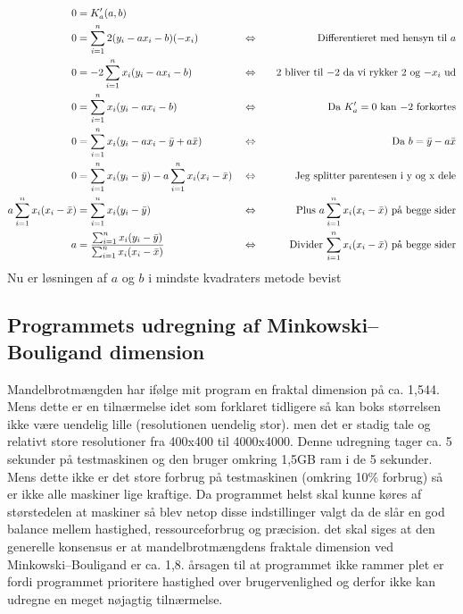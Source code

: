 \documentclass{article}
\begin{document}
\begin{align*}
0&=K'_a(a,b)\\
0&=\sum_{i=1}^{n}2(y_i-ax_i-b) (-x_i)                                      &&\Leftrightarrow &&&\text{Differentieret med hensyn til $a$} \\
0&=-2\sum_{i=1}^{n}x_i(y_i-ax_i-b)                                         &&\Leftrightarrow &&&\text{$2$ bliver til $-2$ da vi rykker 2 og $-x_i$ ud} \\
0&=\sum_{i=1}^{n}x_i(y_i-ax_i-b)                                           &&\Leftrightarrow &&&\text{Da $K'_a=0$ kan $-2$ forkortes}\\
0&=\sum_{i=1}^{n}x_i(y_i-ax_i-\Bar{y}+a\Bar{x})                            &&\Leftrightarrow &&&\text{Da $b = \Bar{y}-a\Bar{x}$}\\
0&=\sum_{i=1}^{n}x_i(y_i-\Bar{y})-a\sum_{i=1}^{n}x_i(x_i-\Bar{x})          &&\Leftrightarrow &&&\text{Jeg splitter parentesen i y og x dele}\\
a\sum_{i=1}^{n}x_i(x_i-\Bar{x})&=\sum_{i=1}^{n}x_i(y_i-\Bar{y})            &&\Leftrightarrow &&&\text{Plus $a\sum_{i=1}^{n}x_i(x_i-\Bar{x})$ på begge sider}\\
a&= \frac{\sum_{i=1}^{n}x_i(y_i-\Bar{y})}{\sum_{i=1}^{n}x_i(x_i-\Bar{x})}  &&\Leftrightarrow &&&\text{Divider $\sum_{i=1}^{n}x_i(x_i-\Bar{x})$ på begge sider}\\
\end{align*}
Nu er løsningen af $a$ og $b$ i mindste kvadraters metode bevist
\hfill\blacksquare
\subsection{Programmets udregning af Minkowski–Bouligand dimension}
Mandelbrotmængden har ifølge mit program en fraktal dimension på ca. 1,544. Mens dette er en tilnærmelse idet som forklaret tidligere så kan boks størrelsen ikke være uendelig lille (resolutionen uendelig stor). men det er stadig tale og relativt store resolutioner fra 400x400 til 4000x4000. Denne udregning tager ca. 5 sekunder på testmaskinen og den bruger omkring 1,5GB ram i de 5 sekunder. Mens dette ikke er det store forbrug på testmaskinen (omkring 10\% forbrug) så er ikke alle maskiner lige kraftige. Da programmet helst skal kunne køres af størstedelen at maskiner så blev netop disse indstillinger valgt da de slår en god balance mellem hastighed, ressourceforbrug og præcision. det skal siges at den generelle konsensus er at mandelbrotmængdens fraktale dimension ved Minkowski–Bouligand er ca. 1,8. årsagen til at programmet ikke rammer plet er fordi programmet prioritere hastighed over brugervenlighed og derfor ikke kan udregne en meget nøjagtig tilnærmelse.
\end{document}
